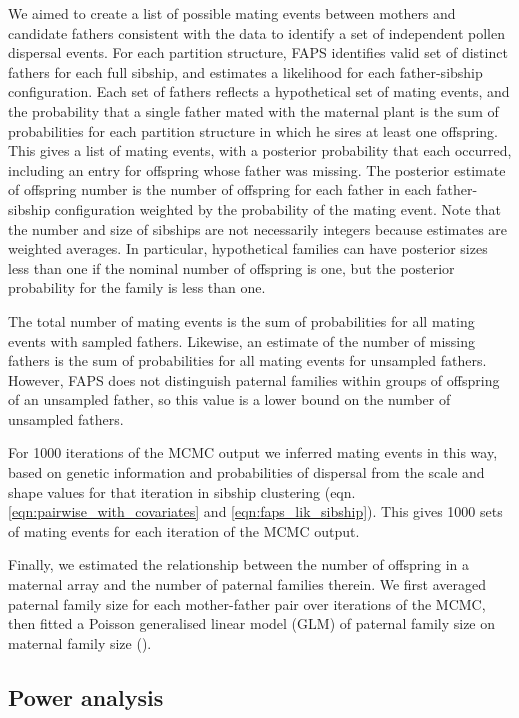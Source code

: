 \documentclass[10pt, a4paper, twocolumn]{article} %
\begin{document}
We aimed to create a list of possible mating events between mothers and candidate fathers consistent with the data to identify a set of independent pollen dispersal events.
For each partition structure, FAPS identifies valid set of distinct fathers for each full sibship, and estimates a likelihood for each father-sibship configuration.
Each set of fathers reflects a hypothetical set of mating events, and the probability that a single father mated with the maternal plant is the sum of probabilities for each partition structure in which he sires at least one offspring.
This gives a list of mating events, with a posterior probability that each occurred, including an entry for offspring whose father was missing.
The posterior estimate of offspring number is the number of offspring for each father in each father-sibship configuration weighted by the probability of the mating event.
Note that the number and size of sibships are not necessarily integers because estimates are weighted averages.
In particular, hypothetical families can have posterior sizes less than one if the nominal number of offspring is one, but the posterior probability for the family is less than one.

The total number of mating events is the sum of probabilities for all mating events with sampled fathers.
Likewise, an estimate of the number of missing fathers is the sum of probabilities for all mating events for unsampled fathers.
However, FAPS does not distinguish paternal families within groups of offspring of an unsampled father, so this value is a lower bound on the number of unsampled fathers.

For 1000 iterations of the MCMC output we inferred mating events in this way, based on genetic information and probabilities of dispersal from the scale and shape values for that iteration in sibship clustering (eqn. \ref{eqn:pairwise_with_covariates} and \ref{eqn:faps_lik_sibship}). This gives 1000 sets of mating events for each iteration of the MCMC output.

Finally, we estimated the relationship between the number of offspring in a maternal array and the number of paternal families therein.
We first averaged paternal family size for each mother-father pair over iterations of the MCMC, then fitted a Poisson generalised linear model (GLM) of paternal family size on maternal family size (\cite{McCullagh1989}).

\subsection{Power analysis}
\end{document}
